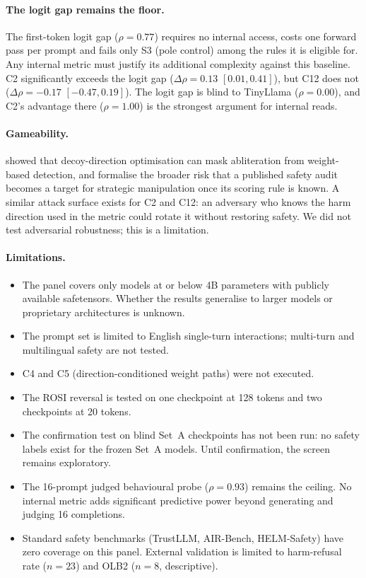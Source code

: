\documentclass[11pt,letterpaper]{article}
\begin{document}
\paragraph{The logit gap remains the floor.}
The first-token logit gap ($\rho = 0.77$) requires no internal access,
costs one forward pass per prompt and fails only S3 (pole control) among
the rules it is eligible for. Any internal metric must justify its
additional complexity against this baseline. C2 significantly exceeds the
logit gap ($\Delta\rho = 0.13$ $[0.01, 0.41]$), but C12 does not
($\Delta\rho = -0.17$ $[-0.47, 0.19]$). The logit gap is blind to
TinyLlama ($\rho = 0.00$), and C2's advantage there ($\rho = 1.00$) is
the strongest argument for internal reads.

\paragraph{Gameability.}
\citet{Muhamed2026} showed that decoy-direction optimisation can mask
abliteration from weight-based detection, and \citet{Burnat2026}
formalise the broader risk that a published safety audit becomes a target
for strategic manipulation once its scoring rule is known. A similar
attack surface exists for C2 and C12: an adversary who knows the harm
direction used in the metric could rotate it without restoring safety. We
did not test adversarial robustness; this is a limitation.

\paragraph{Limitations.}
\begin{itemize}
\item The panel covers only models at or below 4B parameters with
  publicly available safetensors. Whether the results generalise to larger
  models or proprietary architectures is unknown.
\item The prompt set is limited to English single-turn interactions;
  multi-turn and multilingual safety are not tested.
\item C4 and C5 (direction-conditioned weight paths) were not executed.
\item The ROSI reversal is tested on one checkpoint at 128 tokens and two
  checkpoints at 20 tokens.
\item The confirmation test on blind Set~A checkpoints has not been run:
  no safety labels exist for the frozen Set~A models. Until confirmation,
  the screen remains exploratory.
\item The 16-prompt judged behavioural probe ($\rho = 0.93$) remains the
  ceiling. No internal metric adds significant predictive power beyond
  generating and judging 16 completions.
\item Standard safety benchmarks (TrustLLM, AIR-Bench, HELM-Safety) have
  zero coverage on this panel. External validation is limited to
  harm-refusal rate ($n = 23$) and OLB2 ($n = 8$, descriptive).
\end{itemize}
\end{document}
